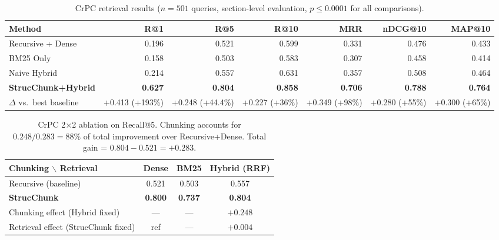 \documentclass[sn-mathphys,Numbered]{sn-jnl}%
\begin{document}
\begin{table}[htbp]
\centering
\begin{adjustbox}{max width=\textwidth}
\begin{tabular}{lrrrrrr}
\toprule
\textbf{Method} & \textbf{R@1} & \textbf{R@5} & \textbf{R@10}
               & \textbf{MRR} & \textbf{nDCG@10} & \textbf{MAP@10} \\
\midrule
Recursive + Dense       & 0.196 & 0.521 & 0.599 & 0.331 & 0.476 & 0.433 \\
BM25 Only               & 0.158 & 0.503 & 0.583 & 0.307 & 0.458 & 0.414 \\
Naive Hybrid            & 0.214 & 0.557 & 0.631 & 0.357 & 0.508 & 0.464 \\
\textbf{StrucChunk+Hybrid} & \textbf{0.627} & \textbf{0.804}
                        & \textbf{0.858} & \textbf{0.706}
                        & \textbf{0.788} & \textbf{0.764} \\
\midrule
$\Delta$ vs.\ best baseline & +0.413 (+193\%) & +0.248 (+44.4\%)
                        & +0.227 (+36\%) & +0.349 (+98\%)
                        & +0.280 (+55\%) & +0.300 (+65\%) \\
\bottomrule
\end{tabular}
\end{adjustbox}
\caption{CrPC retrieval results ($n=501$ queries, section-level evaluation,
  $p \leq 0.0001$ for all comparisons).}
\label{tab:crpc_results}
\end{table}

\begin{table}[htbp]
\centering
\begin{tabular}{lccc}
\toprule
\textbf{Chunking $\backslash$ Retrieval} & \textbf{Dense}
  & \textbf{BM25} & \textbf{Hybrid (RRF)} \\
\midrule
Recursive (baseline)            & 0.521 & 0.503 & 0.557 \\
\textbf{StrucChunk}             & \textbf{0.800} & \textbf{0.737} & \textbf{0.804} \\
\midrule
Chunking effect (Hybrid fixed)  & ---   & ---   & $+0.248$ \\
Retrieval effect (StrucChunk fixed) & ref & ---  & $+0.004$ \\
\bottomrule
\end{tabular}
\caption{CrPC 2$\times$2 ablation on Recall@5.  Chunking accounts for
  $0.248/0.283 = 88\%$ of total improvement over Recursive+Dense.
  Total gain = $0.804 - 0.521 = +0.283$.}
\label{tab:crpc_ablation}
\end{table}
\end{document}
